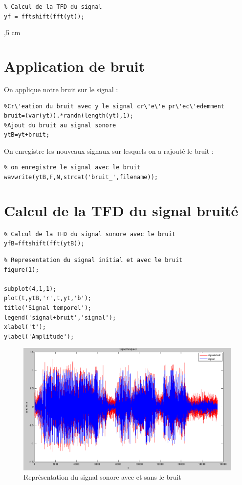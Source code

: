 \documentclass[a4paper, oneside]{report}
\begin{document}
\begin{lstlisting}
% Calcul de la TFD du signal
yf = fftshift(fft(yt));
\end{lstlisting}

,5 cm

\section{Application de bruit}

On applique notre bruit sur le signal : \\

\begin{lstlisting}
%Cr\'eation du bruit avec y le signal cr\'e\'e pr\'ec\'edemment
bruit=(var(yt)).*randn(length(yt),1);
%Ajout du bruit au signal sonore
ytB=yt+bruit;
\end{lstlisting}

On enregistre les nouveaux signaux sur lesquels on a rajout\'e le bruit : \\

\begin{lstlisting}
% on enregistre le signal avec le bruit
wavwrite(ytB,F,N,strcat('bruit_',filename));        
\end{lstlisting}

\newpage{}

\section{Calcul de la TFD du signal bruit\'e}

\begin{lstlisting}
% Calcul de la TFD du signal sonore avec le bruit
yfB=fftshift(fft(ytB));
\end{lstlisting}

\begin{lstlisting}
% Representation du signal initial et avec le bruit
figure(1);

subplot(4,1,1);
plot(t,ytB,'r',t,yt,'b');
title('Signal temporel');
legend('signal+bruit','signal');
xlabel('t');
ylabel('Amplitude');
\end{lstlisting}

  \begin{figure}[h]
 \centering
 \includegraphics[scale=0.42]{images/source_bruit.png}
 \caption{Repr\'esentation du signal sonore avec et sans le bruit}
 \end{figure}
 
\end{document}
